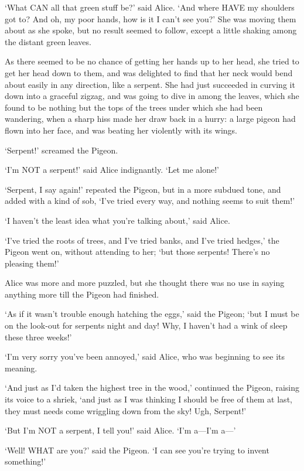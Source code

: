 \documentclass[12pt]{book}
\begin{document}
\begin{Parallel}[p]{}{}
{‘What CAN all that green stuff be?’ said Alice. ‘And where HAVE my shoulders got to? And oh, my poor hands, how is it I can’t see you?’ She was moving them about as she spoke, but no result seemed to follow, except a little shaking among the distant green leaves.

As there seemed to be no chance of getting her hands up to her head, she tried to get her head down to them, and was delighted to find that her neck would bend about easily in any direction, like a serpent. She had just succeeded in curving it down into a graceful zigzag, and was going to dive in among the leaves, which she found to be nothing but the tops of the trees under which she had been wandering, when a sharp hiss made her draw back in a hurry: a large pigeon had flown into her face, and was beating her violently with its wings.

‘Serpent!’ screamed the Pigeon.

‘I’m NOT a serpent!’ said Alice indignantly. ‘Let me alone!’

‘Serpent, I say again!’ repeated the Pigeon, but in a more subdued tone, and added with a kind of sob, ‘I’ve tried every way, and nothing seems to suit them!’

‘I haven’t the least idea what you’re talking about,’ said Alice.

‘I’ve tried the roots of trees, and I’ve tried banks, and I’ve tried hedges,’ the Pigeon went on, without attending to her; ‘but those serpents! There’s no pleasing them!’

Alice was more and more puzzled, but she thought there was no use in saying anything more till the Pigeon had finished.

‘As if it wasn’t trouble enough hatching the eggs,’ said the Pigeon; ‘but I must be on the look-out for serpents night and day! Why, I haven’t had a wink of sleep these three weeks!’

‘I’m very sorry you’ve been annoyed,’ said Alice, who was beginning to see its meaning.

‘And just as I’d taken the highest tree in the wood,’ continued the Pigeon, raising its voice to a shriek, ‘and just as I was thinking I should be free of them at last, they must needs come wriggling down from the sky! Ugh, Serpent!’

‘But I’m NOT a serpent, I tell you!’ said Alice. ‘I’m a—I’m a—’

‘Well! WHAT are you?’ said the Pigeon. ‘I can see you’re trying to invent something!’

}
\end{Parallel}
\end{document}
